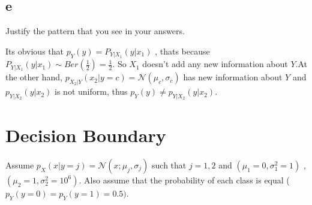 \documentclass[12pt]{article}
\begin{document}
\subsection{e}
Justify the pattern that you see in your answers.
\begin{qsolve}
    Its obvious that $p_Y(y) = P_{Y|X_1}(y|x_1)$ , thats because $P_{Y|X_1}(y|x_1) \sim Ber(\frac{1}{2}) = \frac{1}{2}$. So $X_1$ doesn't add any new information about $Y$.At the other hand, $p_{X_2|Y}(x_2|y=c) = \mathcal{N}(\mu_c , \sigma_c)$ has new information about $Y$ and $p_{Y|X_2}(y|x_2)$ is not uniform, thus $p_Y(y) \neq p_{Y|X_2}(y|x_2)$.
\end{qsolve}
\section{Decision Boundary}
Assume $p_X(x|y=j) = \mathcal{N}(x;\mu_j , \sigma_j)$ such that $j=1,2$ and $(\mu_1 = 0 , \sigma_{1}^2 = 1)$ , $(\mu_2 = 1 , \sigma_{2}^2 = 10^6)$.
Also assume that the probability of each class is equal ($p_Y(y=0) = p_Y(y=1) = 0.5)$.
\end{document}
